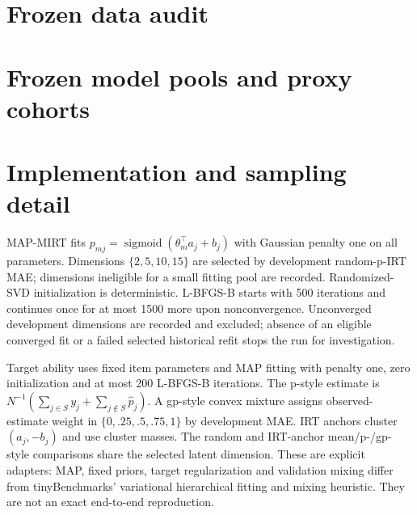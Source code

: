\documentclass{article}
\newcommand{\inlinetable}[1]{\begingroup\let\standardtable\table\renewcommand{\table}[1][]{\standardtable[H]}\endgroup}
\newcommand{\inlinefigure}[1]{\begingroup\let\standardfigure\figure\renewcommand{\figure}[1][]{\standardfigure[H]}\endgroup}
\begin{document}
\clearpage


\clearpage
\appendix
\section{Frozen data audit}\label{app:audit}
\inlinetable{tables/data_audit.tex}
\clearpage
\section{Frozen model pools and proxy cohorts}\label{app:pools}
\inlinetable{tables/protocol_counts.tex}
\clearpage
\inlinetable{tables/family_cohorts.tex}
\clearpage
\section{Implementation and sampling detail}\label{app:implementation}
MAP-MIRT fits $p_{mj}=\operatorname{sigmoid}(\theta_m^\top a_j+b_j)$ with Gaussian penalty one on all parameters. Dimensions $\{2,5,10,15\}$ are selected by development random-p-IRT MAE; dimensions ineligible for a small fitting pool are recorded. Randomized-SVD initialization is deterministic. L-BFGS-B starts with 500 iterations and continues once for at most 1500 more upon nonconvergence. Unconverged development dimensions are recorded and excluded; absence of an eligible converged fit or a failed selected historical refit stops the run for investigation.

Target ability uses fixed item parameters and MAP fitting with penalty one, zero initialization and at most 200 L-BFGS-B iterations. The p-style estimate is $N^{-1}(\sum_{j\in S}y_j+\sum_{j\notin S}\widehat p_j)$. A gp-style convex mixture assigns observed-estimate weight in $\{0,.25,.5,.75,1\}$ by development MAE. IRT anchors cluster $(a_j,-b_j)$ and use cluster masses. The random and IRT-anchor mean/p-/gp-style comparisons share the selected latent dimension. These are explicit adapters: MAP, fixed priors, target regularization and validation mixing differ from tinyBenchmarks' variational hierarchical fitting and mixing heuristic. They are not an exact end-to-end reproduction.
\inlinefigure{figures/crossfit_design.tex}
\clearpage
\end{document}
